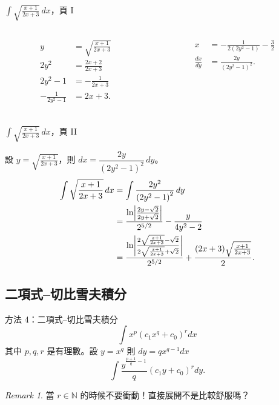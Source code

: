 \documentclass{beamer}
\newcommand{\Left} {\mathopen{}\mathclose\bgroup\left}
\newcommand{\Right}{\aftergroup\egroup\right}
\newcommand{\N}{\mathbb N}
\theoremstyle{remark}
\newtheorem{remark}{Remark}
\begin{document}
\begin{CJK}{UTF8}{bsmi}
\begin{frame}{$\displaystyle \int \sqrt{\frac{x+1}{2x+3}}\,dx$，頁 I}
  \begin{columns}
    \begin{column}{0.5\textwidth}
      \begin{align*}
	y &= \sqrt{\frac{x+1}{2x+3}}\\
	2y^2 &= \frac{2x+2}{2x+3}\\
	2y^2 - 1 &= -\frac{1}{2x+3}\\
	-\frac{1}{2y^2 - 1} &= 2x+3.\\
      \end{align*}
    \end{column}
    \begin{column}{0.5\textwidth}
      \begin{align*}
	x &= -\frac{1}{2 \left( 2y^2 - 1 \right)} - \frac32\\
	\frac{dx}{dy} &= \frac{2y}{\left( 2y^2 - 1 \right)^2}.
      \end{align*}
    \end{column}
  \end{columns}
\end{frame}

\begin{frame}{$\displaystyle \int \sqrt{\frac{x+1}{2x+3}}\,dx$，頁 II}
  \begin{solution}
    設 $\displaystyle y = \sqrt{\frac{x+1}{2x+3}}$，則 $dx = \dfrac{2y}{\left( 2y^2 - 1 \right)^2}\,dy$。
    \begin{align*}
      \int \sqrt{\frac{x+1}{2x+3}}\,dx &= \int \frac{2y^2}{\left( 2y^2 - 1 \right)^2}\,dy  \qquad \\
	&= \frac{\ln \Left| \frac{2y - \sqrt2}{2y + \sqrt2} \Right|}{2^{5/2}} - \frac{y}{4y^2 - 2}\\
	&= \frac{\ln \Left| \frac{2\sqrt{\frac{x+1}{2x+3}} - \sqrt2}{2\sqrt{\frac{x+1}{2x+3}} + \sqrt2} \Right|}{2^{5/2}}
	  + \frac{(2x+3) \sqrt{\frac{x+1}{2x+3}}}{2}.
    \end{align*}
  \end{solution}
\end{frame}

\subsection[切比雪夫積分]{二項式--切比雪夫積分}
\begin{frame}{方法 4：二項式--切比雪夫積分}
  \[\int x^p \left( c_1 x^q + c_0 \right)^r dx\]
  其中 $p,q,r$ 是有理數。設 $y = x^q$ 則 $dy = qx^{q-1} dx$
  \[\int \frac{y^{\frac{p+1}{q}-1}}{q} \left( c_1 y + c_0 \right)^r dy.\]
  \begin{remark}
    當 $r \in \N$ 的時候不要衝動！直接展開不是比較舒服嗎？
  \end{remark}
\end{frame}


\end{CJK}
\end{document}

